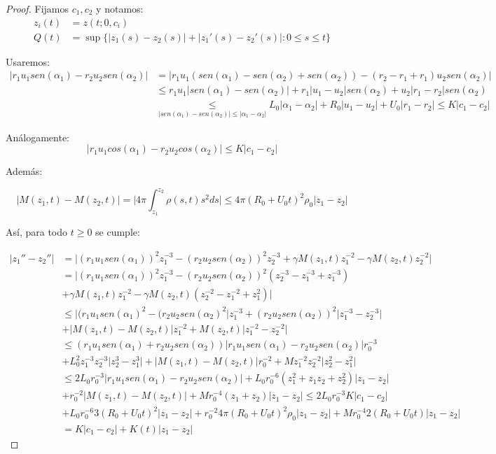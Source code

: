 \documentclass[a4paper,10pt]{scrartcl}
\theoremstyle{definition}
\numberwithin{equation}{section}
\begin{document}
\begin{proof}
 Fijamos $c_1, c_2$ y notamos:
 \begin{align*}
    z_i(t) &= z(t; 0, c_i)\\
    Q(t) &= \sup\{|z_1(s) - z_2(s)| + |z_1'(s) - z_2'(s)|: 0 \le s \le t\}
 \end{align*}
 
 
 Usaremos:
 \begin{align*}
 |r_1 u_1 sen(\alpha_1) - r_2 u_2 sen(\alpha_2)| &= |r_1 u_1 (sen(\alpha_1) - sen(\alpha_2) + sen(\alpha_2)) - (r_2 - r_1 + r_1) u_2 sen(\alpha_2)| \\
 &\le r_1 u_1 |sen(\alpha_1) - sen(\alpha_2)| + r_1|u_1 - u_2| sen(\alpha_2) + u_2|r_1 - r_2| sen(\alpha_2) \\
 &\underset{|sen(\alpha_1) - sen(\alpha_2)| \le |\alpha_1 - \alpha_2|}{\le} L_0|\alpha_1 - \alpha_2| + R_0|u_1 - u_2| + U_0|r_1 - r_2| \le K|c_1 - c_2|
 \end{align*}
 
 Análogamente:
 \[
  |r_1 u_1 cos(\alpha_1) - r_2 u_2 cos(\alpha_2)| \le K|c_1 - c_2|
 \]
 
 Además:
 
\[
 |M(z_1, t) - M(z_2, t)| = \bigg|4\pi \int_{z_1}^{z_2} \rho(s,t) s^2 ds \bigg| \le 4\pi(R_0 + U_0t)^2 \rho_0 |z_1 - z_2|
\]

 
 
 Así, para todo $t\ge 0$ se cumple:
 
 \begin{align*}
  |z_1'' - z_2''| &=
  \bigg|(r_1 u_1 sen(\alpha_1))^2 z_1^{-3} - (r_2 u_2 sen(\alpha_2))^2 z_2^{-3} + \gamma M(z_1, t) z_1^{-2} - \gamma M(z_2, t) z_2^{-2} \bigg| \\
  &= \bigg|(r_1 u_1 sen(\alpha_1))^2 z_1^{-3} - (r_2 u_2 sen(\alpha_2))^2 (z_2^{-3} - z_1^{-3} + z_1^{-3}) \\
  &+ \gamma M(z_1, t) z_1^{-2} - \gamma M(z_2, t) (z_2^{-2} - z_1^{-2} + z_1^{2}) \bigg| \\
  &\le \bigg|(r_1 u_1 sen(\alpha_1)^2 - (r_2 u_2 sen(\alpha_2)^2 \bigg| z_1^{-3} + (r_2 u_2 sen(\alpha_2))^2 \bigg|z_1^{-3} - z_2^{-3}\bigg| \\
  &+ \bigg|M(z_1,t) - M(z_2,t) \bigg|z_1^{-2} + M(z_2, t) \bigg|z_1^{-2} - z_2^{-2}\bigg| \\
  &\le (r_1 u_1 sen(\alpha_1)+ r_2 u_2 sen(\alpha_2))\bigg|r_1 u_1 sen(\alpha_1) - r_2 u_2 sen(\alpha_2)\bigg| r_0^{-3} \\
  &+ L_0^2 z_1^{-3}z_2^{-3} \bigg|z_2^3 - z_1^3 \bigg| + \bigg|M(z_1,t) - M(z_2,t)\bigg| r_0^{-2} + Mz_1^{-2} z_2^{-2} \bigg|z_2^2 - z_1^2\bigg| \\
  &\le 2L_0 r_0^{-3}\bigg|r_1 u_1 sen(\alpha_1) - r_2 u_2 sen(\alpha_2)\bigg|
  + L_0 r_0^{-6}(z_1^2 + z_1 z_2 + z_2^2)\bigg|z_1 - z_2\bigg|\\
  &+ r_0^{-2}\bigg|M(z_1,t) - M(z_2,t)\bigg| + Mr_0^{-4}(z_1 + z_2) \bigg|z_1 - z_2\bigg| \le 2L_0 r_0^{-3} K|c_1 - c_2| \\
  &+ L_0 r_0^{-6} 3(R_0 + U_0t)^2 |z_1 - z_2| + r_0^{-2} 4\pi (R_0 + U_0t)^2 \rho_0 |z_1 - z_2| + Mr_0^{-4} 2(R_0 + U_0t) |z_1 - z_2|\\
  &= K|c_1 - c_2| + K(t)|z_1 - z_2|
 \end{align*}
 

\end{proof}
\end{document}
